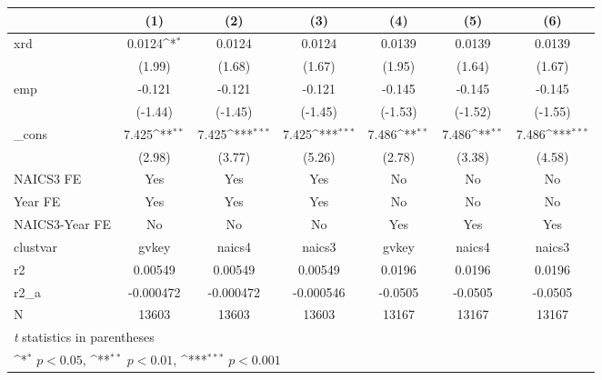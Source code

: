 {
\def\sym#1{\ifmmode^{#1}\else\(^{#1}\)\fi}
\begin{tabular}{l*{6}{c}}
\hline\hline
            &\multicolumn{1}{c}{(1)}         &\multicolumn{1}{c}{(2)}         &\multicolumn{1}{c}{(3)}         &\multicolumn{1}{c}{(4)}         &\multicolumn{1}{c}{(5)}         &\multicolumn{1}{c}{(6)}         \\
\hline
xrd         &      0.0124\sym{*}  &      0.0124         &      0.0124         &      0.0139         &      0.0139         &      0.0139         \\
            &      (1.99)         &      (1.68)         &      (1.67)         &      (1.95)         &      (1.64)         &      (1.67)         \\
[1em]
emp         &      -0.121         &      -0.121         &      -0.121         &      -0.145         &      -0.145         &      -0.145         \\
            &     (-1.44)         &     (-1.45)         &     (-1.45)         &     (-1.53)         &     (-1.52)         &     (-1.55)         \\
[1em]
\_cons      &       7.425\sym{**} &       7.425\sym{***}&       7.425\sym{***}&       7.486\sym{**} &       7.486\sym{**} &       7.486\sym{***}\\
            &      (2.98)         &      (3.77)         &      (5.26)         &      (2.78)         &      (3.38)         &      (4.58)         \\
[1em]
NAICS3 FE   &         Yes         &         Yes         &         Yes         &          No         &          No         &          No         \\
[1em]
Year FE     &         Yes         &         Yes         &         Yes         &          No         &          No         &          No         \\
[1em]
NAICS3-Year FE&          No         &          No         &          No         &         Yes         &         Yes         &         Yes         \\
\hline
clustvar    &       gvkey         &      naics4         &      naics3         &       gvkey         &      naics4         &      naics3         \\
r2          &     0.00549         &     0.00549         &     0.00549         &      0.0196         &      0.0196         &      0.0196         \\
r2\_a        &   -0.000472         &   -0.000472         &   -0.000546         &     -0.0505         &     -0.0505         &     -0.0505         \\
N           &       13603         &       13603         &       13603         &       13167         &       13167         &       13167         \\
\hline\hline
\multicolumn{7}{l}{\footnotesize \textit{t} statistics in parentheses}\\
\multicolumn{7}{l}{\footnotesize \sym{*} \(p<0.05\), \sym{**} \(p<0.01\), \sym{***} \(p<0.001\)}\\
\end{tabular}
}

